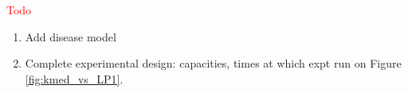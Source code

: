 

\textcolor{red}{Todo}
\begin{enumerate}
\item
Add disease model
\item
Complete experimental design: capacities, times at which expt run
on Figure \ref{fig:kmed_vs_LP1}.
\end{enumerate}

